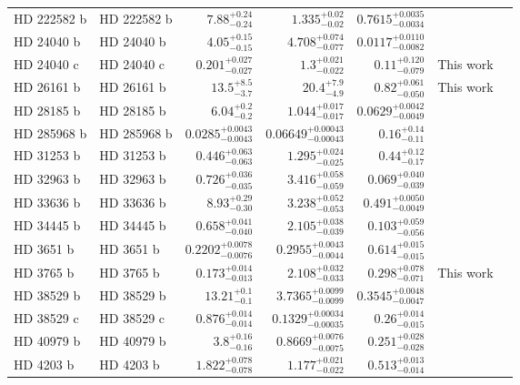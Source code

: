 \begin{longtable*}{llrrrrr}
HD 222582 b & HD 222582 b & $7.88^{+0.24}_{-0.24}$ & $1.335^{+0.02}_{-0.02}$ & $0.7615^{+0.0035}_{-0.0034}$ & \cite{Vogt00} & \\ 
HD 24040 b & HD 24040 b & $4.05^{+0.15}_{-0.15}$ & $4.708^{+0.074}_{-0.077}$ & $0.0117^{+0.0110}_{-0.0082}$ & \cite{Boisse12} & \\ 
HD 24040 c & HD 24040 c & $0.201^{+0.027}_{-0.027}$ & $1.3^{+0.021}_{-0.022}$ & $0.11^{+0.120}_{-0.079}$ & This work & \\ 
HD 26161 b & HD 26161 b & $13.5^{+8.5}_{-3.7}$ & $20.4^{+7.9}_{-4.9}$ & $0.82^{+0.061}_{-0.050}$ & This work & \\ 
HD 28185 b & HD 28185 b & $6.04^{+0.2}_{-0.2}$ & $1.044^{+0.017}_{-0.017}$ & $0.0629^{+0.0042}_{-0.0049}$ & \cite{Santos01} & \\ 
HD 285968 b & HD 285968 b & $0.0285^{+0.0043}_{-0.0043}$ & $0.06649^{+0.00043}_{-0.00043}$ & $0.16^{+0.14}_{-0.11}$ & \cite{Forveille09} & \\ 
HD 31253 b & HD 31253 b & $0.446^{+0.063}_{-0.063}$ & $1.295^{+0.024}_{-0.025}$ & $0.44^{+0.12}_{-0.17}$ & \cite{Meschiari11} & \\ 
HD 32963 b & HD 32963 b & $0.726^{+0.036}_{-0.035}$ & $3.416^{+0.058}_{-0.059}$ & $0.069^{+0.040}_{-0.039}$ & \cite{Rowan16} & \\ 
HD 33636 b & HD 33636 b & $8.93^{+0.29}_{-0.30}$ & $3.238^{+0.052}_{-0.053}$ & $0.491^{+0.0050}_{-0.0049}$ & \cite{Vogt02} & \\ 
HD 34445 b & HD 34445 b & $0.658^{+0.041}_{-0.040}$ & $2.105^{+0.038}_{-0.039}$ & $0.103^{+0.059}_{-0.056}$ & \cite{Howard10} & \\ 
HD 3651 b & HD 3651 b & $0.2202^{+0.0078}_{-0.0076}$ & $0.2955^{+0.0043}_{-0.0044}$ & $0.614^{+0.015}_{-0.015}$ & \cite{Butler06} & \\ 
HD 3765 b & HD 3765 b & $0.173^{+0.014}_{-0.013}$ & $2.108^{+0.032}_{-0.033}$ & $0.298^{+0.078}_{-0.071}$ & This work & \\ 
HD 38529 b & HD 38529 b & $13.21^{+0.1}_{-0.1}$ & $3.7365^{+0.0099}_{-0.0099}$ & $0.3545^{+0.0048}_{-0.0047}$ & \cite{Fischer01} & \\ 
HD 38529 c & HD 38529 c & $0.876^{+0.014}_{-0.014}$ & $0.1329^{+0.00034}_{-0.00035}$ & $0.26^{+0.014}_{-0.015}$ & \cite{Butler06} & \\ 
HD 40979 b & HD 40979 b & $3.8^{+0.16}_{-0.16}$ & $0.8669^{+0.0076}_{-0.0075}$ & $0.251^{+0.028}_{-0.028}$ & \cite{Butler06} & \\ 
HD 4203 b & HD 4203 b & $1.822^{+0.078}_{-0.078}$ & $1.177^{+0.021}_{-0.022}$ & $0.513^{+0.013}_{-0.014}$ & \cite{Vogt02} & \\ 

\end{longtable*}
